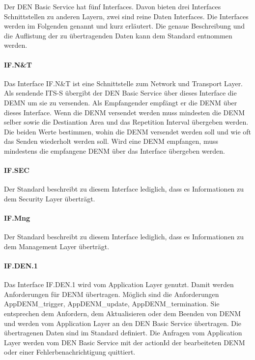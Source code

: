 Der \ac{DEN} Basic Service hat fünf Interfaces. Davon bieten drei Interfaces Schnittstellen zu anderen Layern, zwei sind reine Daten Interfaces. Die Interfaces werden im Folgenden genannt und kurz erläutert. Die genaue Beschreibung und die Auflistung der zu übertragenden Daten  kann dem Standard \cite{en302637-3} entnommen werden.

\paragraph{IF.N\&T}
Das Interface IF.N\&T ist  eine Schnittstelle zum Network und Transport Layer. Als sendende \ac{ITS-S} übergibt der \ac{DEN} Basic Service über dieses Interface die \ac{DEMN} um sie zu versenden. Als Empfangender empfängt er die \ac{DENM} über dieses Interface. Wenn die \ac{DENM} versendet werden muss mindesten die \ac{DENM} selber sowie die Destiantion Area und das Repetition Interval übergeben werden. Die beiden Werte bestimmen, wohin die \ac{DENM} versendet werden soll und wie oft das Senden wiederholt werden soll. Wird eine \ac{DENM} empfangen, muss mindestens die empfangene  \ac{DENM} über das Interface übergeben werden.

\paragraph{IF.SEC}
Der Standard \cite{en302637-3} beschreibt zu diesem Interface lediglich, dass es Informationen zu dem Security Layer überträgt.  
\paragraph{IF.Mng}
Der Standard \cite{en302637-3} beschreibt zu diesem Interface lediglich, dass es Informationen zu dem Management Layer überträgt. 
\paragraph{IF.DEN.1}
Das Interface IF.DEN.1 wird vom Application Layer genutzt. Damit werden Anforderungen für \ac{DENM} übertragen. Möglich sind die Anforderungen AppDENM\_trigger, AppDENM\_update, AppDENM\_termination. Sie entsprechen dem Anfordern, dem Aktualisieren oder dem Beenden von \ac{DENM} und werden vom Application Layer an den \ac{DEN} Basic Service übertragen. Die übertragenen Daten sind im Standard \cite{en302637-3} definiert. Die Anfragen vom Application Layer werden vom \ac{DEN} Basic Service mit der actionId der bearbeiteten \ac{DENM} oder einer Fehlerbenachrichtigung quittiert.
